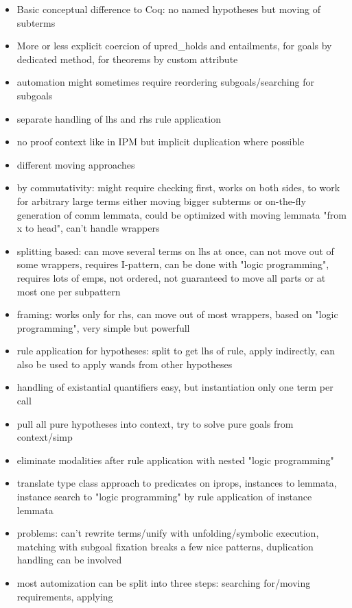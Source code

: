\documentclass[11pt,a4paper]{article}
\begin{document}
\begin{itemize}
\item Basic conceptual difference to Coq: no named hypotheses but moving of subterms
\item More or less explicit coercion of upred_holds and entailments, for goals by dedicated method,
  for theorems by custom attribute
\item automation might sometimes require reordering subgoals/searching for subgoals
\item separate handling of lhs and rhs rule application
\item no proof context like in IPM but implicit duplication where possible
\item different moving approaches
\item by commutativity: might require checking first, works on both sides, to work for arbitrary 
  large terms either moving bigger subterms or on-the-fly generation of comm lemmata, could be 
  optimized with moving lemmata "from x to head", can't handle wrappers
\item splitting based: can move several terms on lhs at once, can not move out of some wrappers, 
  requires I-pattern, can be done with "logic programming", requires lots of emps, not ordered,
  not guaranteed to move all parts or at most one per subpattern
\item framing: works only for rhs, can move out of most wrappers, based on "logic programming",
  very simple but powerfull
\item rule application for hypotheses: split to get lhs of rule, apply indirectly, can also be used to
  apply wands from other hypotheses
\item handling of existantial quantifiers easy, but instantiation only one term per call
\item pull all pure hypotheses into context, try to solve pure goals from context/simp
\item eliminate modalities after rule application with nested "logic programming"
\item translate type class approach to predicates on iprops, instances to lemmata, instance search
  to "logic programming" by rule application of instance lemmata
\item problems: can't rewrite terms/unify with unfolding/symbolic execution, matching with subgoal
  fixation breaks a few nice patterns, duplication handling can be involved
\item most automization can be split into three steps: searching for/moving requirements, applying 

\end{itemize}
\end{document}
